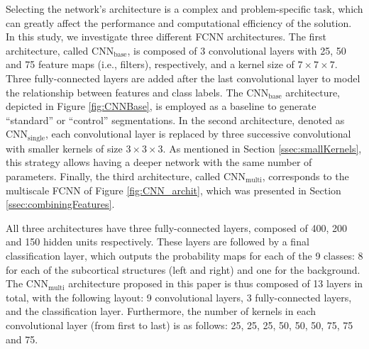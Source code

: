 \documentclass[twoside,fleqn,espcrc2]{elsarticle}
\newcommand{\CNNbase}{\mr{CNN}_\mr{base}}
\newcommand{\CNNsingle}{\mr{CNN}_\mr{single}}
\newcommand{\CNNmulti}{\mr{CNN}_\mr{multi}}
\newcommand{\mr}[1]{\mathrm{#1}}
\begin{document}
Selecting the network's architecture is a complex and problem-specific task, which can greatly affect the performance and computational efficiency of the solution. In this study, we investigate three different FCNN architectures. The first architecture, called $\CNNbase$, is composed of 3 convolutional layers with 25, 50 and 75 feature maps (i.e., filters), respectively, and a kernel size of $7\!\times\!7\!\times 7$. Three fully-connected layers are added after the last convolutional layer to model the relationship between features and class labels. The $\CNNbase$ architecture, depicted in Figure \ref{fig:CNNBase}, is employed as a baseline to generate ``standard'' or ``control'' segmentations. In the second architecture, denoted as $\CNNsingle$, each convolutional layer is replaced by three successive convolutional with smaller kernels of size $3\!\times\!3\!\times 3$. As mentioned in Section \ref{ssec:smallKernels}, this strategy allows having a deeper network with the same number of parameters. Finally, the third architecture, called $\CNNmulti$, corresponds to the multiscale FCNN of Figure \ref{fig:CNN_archit}, which was presented in Section \ref{ssec:combiningFeatures}.

All three architectures have three fully-connected layers, composed of 400, 200 and 150 hidden units respectively. These layers are followed by a final classification layer, which outputs the probability maps for each of the 9 classes: 8 for each of the subcortical structures (left and right) and one for the background. The $\CNNmulti$ architecture proposed in this paper is thus composed of 13 layers in total, with the following layout: 9 convolutional layers, 3 fully-connected layers, and the classification layer. Furthermore, the number of kernels in each convolutional layer (from first to last) is as follows: 25, 25, 25, 50, 50, 50, 75, 75 and 75. 
\end{document}
